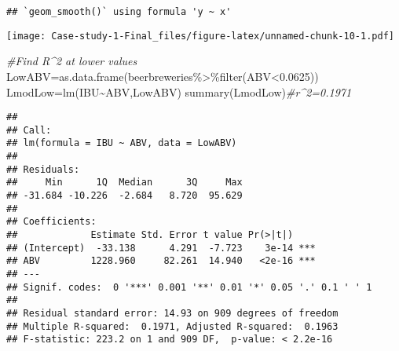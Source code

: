 \documentclass[
]{article}
\newenvironment{Shaded}{\begin{snugshade}}{\end{snugshade}}
\newcommand{\CommentTok}[1]{\textcolor[rgb]{0.56,0.35,0.01}{\textit{#1}}}
\newcommand{\FloatTok}[1]{\textcolor[rgb]{0.00,0.00,0.81}{#1}}
\newcommand{\FunctionTok}[1]{\textcolor[rgb]{0.00,0.00,0.00}{#1}}
\newcommand{\NormalTok}[1]{#1}
\newcommand{\OtherTok}[1]{\textcolor[rgb]{0.56,0.35,0.01}{#1}}
\newcommand{\SpecialCharTok}[1]{\textcolor[rgb]{0.00,0.00,0.00}{#1}}
\begin{document}
\begin{verbatim}
## `geom_smooth()` using formula 'y ~ x'
\end{verbatim}

\texttt{[image: Case-study-1-Final\_files/figure-latex/unnamed-chunk-10-1.pdf]}

\begin{Shaded}
\begin{Highlighting}[]
\CommentTok{\#Find R\^{}2 at lower values}
\NormalTok{LowABV}\OtherTok{=}\FunctionTok{as.data.frame}\NormalTok{(beerbreweries}\SpecialCharTok{\%\textgreater{}\%}\FunctionTok{filter}\NormalTok{(ABV}\SpecialCharTok{\textless{}}\FloatTok{0.0625}\NormalTok{))}
\NormalTok{LmodLow}\OtherTok{=}\FunctionTok{lm}\NormalTok{(IBU}\SpecialCharTok{\textasciitilde{}}\NormalTok{ABV,LowABV)}
\FunctionTok{summary}\NormalTok{(LmodLow)}\CommentTok{\#r\^{}2=0.1971}
\end{Highlighting}
\end{Shaded}

\begin{verbatim}
## 
## Call:
## lm(formula = IBU ~ ABV, data = LowABV)
## 
## Residuals:
##     Min      1Q  Median      3Q     Max 
## -31.684 -10.226  -2.684   8.720  95.629 
## 
## Coefficients:
##             Estimate Std. Error t value Pr(>|t|)    
## (Intercept)  -33.138      4.291  -7.723    3e-14 ***
## ABV         1228.960     82.261  14.940   <2e-16 ***
## ---
## Signif. codes:  0 '***' 0.001 '**' 0.01 '*' 0.05 '.' 0.1 ' ' 1
## 
## Residual standard error: 14.93 on 909 degrees of freedom
## Multiple R-squared:  0.1971, Adjusted R-squared:  0.1963 
## F-statistic: 223.2 on 1 and 909 DF,  p-value: < 2.2e-16
\end{verbatim}
\end{document}
